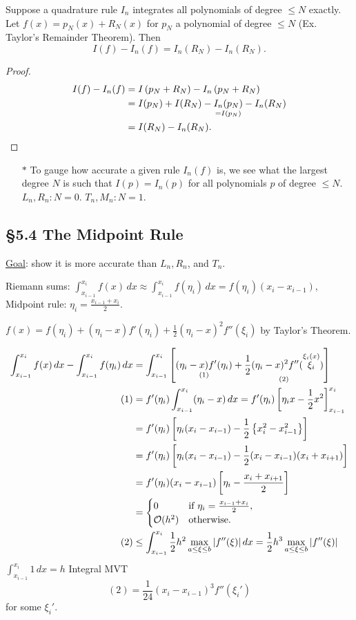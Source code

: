 \documentclass[]{article}
\begin{document}
\begin{theorem}
	Suppose a quadrature rule $I_n$ integrates all polynomials of degree $\leq N$ exactly.
	Let $f(x)=p_N(x) + R_N(x)$ for $p_N$ a polynomial of degree $\leq N$ (Ex. Taylor's Remainder Theorem).
	Then $$I(f)-I_n(f) = I_n(R_N)-I_n(R_N).$$
\end{theorem}
\begin{proof}
	\begin{align*}
		I(f)-I_n(f) &= I\left(p_N+R_N\right)-I_n\left(p_N+R_N\right) \\
					&= I(p_N)+I(R_N) - \underset{=I(p_N)}{I_n(p_N)} - I_n(R_N) \\
					&= I(R_N)-I_n(R_N).
	\end{align*}
\end{proof}
\begin{enumerate}
	\item[$*$] To gauge how accurate a given rule $I_n(f)$ is, we see what the largest degree $N$ is such that $I(p)=I_n(p)$ for all polynomials $p$ of degree $\leq N$.
		$L_n,R_n:N=0$. $T_n,M_n:N=1$.
\end{enumerate}

\subsection*{\S5.4 The Midpoint Rule}

\ul{Goal}: show it is more accurate than $L_n,R_n$, and $T_n$.

Riemann sums: $\int_{x_{i-1}}^{x_i} f(x)\,dx \approx \int_{x_{i-1}}^{x_i} f(\eta_i)\,dx = f(\eta_i)(x_i-x_{i-1})$,
Midpoint rule: $\eta_i=\frac{x_{i-1}+x_i}2$.

\begin{observe}
	$f(x) = f(\eta_i)+(\eta_i-x)f'(\eta_i) + \frac12(\eta_i-x)^2f''(\xi_i)$ by Taylor's Theorem.
\end{observe}
\begin{align*}
	\int_{x_{i-1}}^{x_i} f(x)\,dx - \int_{x_{i-1}}^{x_i} f(\eta_i)\,dx
	&= \int_{x_{i-1}}^{x_i} \left[ \underset{(1)}{(\eta_i-x)f'(\eta_i)} + \underset{(2)}{\frac12(\eta_i-x)^2f''(\overset{\xi_i(x)}{\xi_i})} \right] \\
	(1) &= f'(\eta_i)\int_{x_{i-1}}^{x_i}(\eta_i-x)\,dx
		= f'(\eta_i)\left[\eta_ix-\frac12x^2\right]_{x_{i-1}}^{x_i} \\
		&= f'(\eta_i)\left[\eta_i(x_i-x_{i-1}) - \frac12\left\{ x_i^2-x_{i-1}^2 \right\} \right] \\
		&= f'(\eta_i)\left[\eta_i(x_i-x_{i-1}) - \frac12(x_i-x_{i-1})(x_i+x_{i+1}) \right] \\
		&= f'(\eta_i)(x_i-x_{i-1})\left[\eta_i - \frac{x_i+x_{i+1}}2 \right] \\
		&= \begin{cases} 0 & \text{if } \eta_i = \frac{x_{i-1}+x_i}2, \\ \mathcal{O}(h^2) & \text{otherwise}. \end{cases} \\
	(2) &\leq \int_{x_{i-1}}^{x_i} \frac12h^2 \max_{a\leq\xi\leq b} |f''(\xi)|\,dx
		= \frac12h^3\max_{a\leq\xi\leq b} |f''(\xi)|
\end{align*}
$\int_{x_{i-1}}^{x_i} 1\,dx = h$ Integral MVT
$$ (2) = \frac1{24}(x_i-x_{i-1})^3 f''(\xi_i')$$ for some $\xi_i'$.
\end{document}
